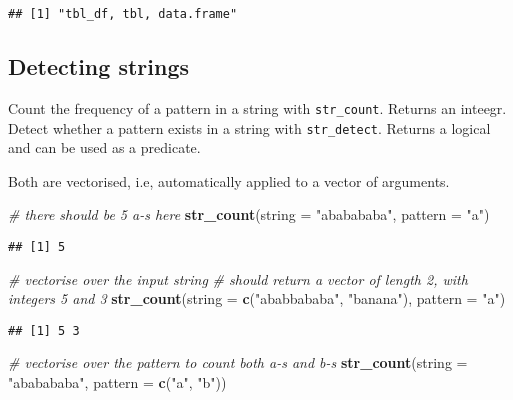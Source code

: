 \documentclass[
]{book}
\newenvironment{Shaded}{}{}
\newcommand{\CommentTok}[1]{\textcolor[rgb]{0.38,0.63,0.69}{\textit{#1}}}
\newcommand{\DataTypeTok}[1]{\textcolor[rgb]{0.56,0.13,0.00}{#1}}
\newcommand{\KeywordTok}[1]{\textcolor[rgb]{0.00,0.44,0.13}{\textbf{#1}}}
\newcommand{\NormalTok}[1]{#1}
\newcommand{\StringTok}[1]{\textcolor[rgb]{0.25,0.44,0.63}{#1}}
\begin{document}
\begin{verbatim}
## [1] "tbl_df, tbl, data.frame"
\end{verbatim}

\hypertarget{detecting-strings}{%
\subsection{Detecting strings}\label{detecting-strings}}

Count the frequency of a pattern in a string with \texttt{str\_count}. Returns an inteegr.
Detect whether a pattern exists in a string with \texttt{str\_detect}. Returns a logical and can be used as a predicate.

Both are vectorised, i.e, automatically applied to a vector of arguments.

\begin{Shaded}
\begin{Highlighting}[]
\CommentTok{# there should be 5 a-s here}
\KeywordTok{str_count}\NormalTok{(}\DataTypeTok{string =} \StringTok{"ababababa"}\NormalTok{, }\DataTypeTok{pattern =} \StringTok{"a"}\NormalTok{)}
\end{Highlighting}
\end{Shaded}

\begin{verbatim}
## [1] 5
\end{verbatim}

\begin{Shaded}
\begin{Highlighting}[]
\CommentTok{# vectorise over the input string}
\CommentTok{# should return a vector of length 2, with integers 5 and 3}
\KeywordTok{str_count}\NormalTok{(}\DataTypeTok{string =} \KeywordTok{c}\NormalTok{(}\StringTok{"ababbababa"}\NormalTok{, }\StringTok{"banana"}\NormalTok{), }\DataTypeTok{pattern =} \StringTok{"a"}\NormalTok{)}
\end{Highlighting}
\end{Shaded}

\begin{verbatim}
## [1] 5 3
\end{verbatim}

\begin{Shaded}
\begin{Highlighting}[]
\CommentTok{# vectorise over the pattern to count both a-s and b-s}
\KeywordTok{str_count}\NormalTok{(}\DataTypeTok{string =} \StringTok{"ababababa"}\NormalTok{, }\DataTypeTok{pattern =} \KeywordTok{c}\NormalTok{(}\StringTok{"a"}\NormalTok{, }\StringTok{"b"}\NormalTok{))}
\end{Highlighting}
\end{Shaded}
\end{document}
